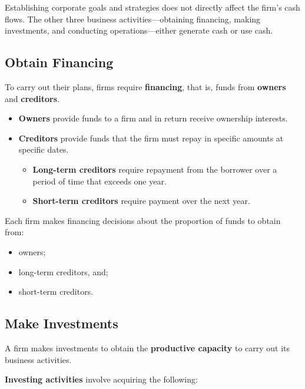 \documentclass{article}\usepackage[]{graphicx}\usepackage[]{xcolor}
\begin{document}
Establishing corporate goals and strategies does not directly affect the firm's cash flows.
The other three business activities---obtaining financing, making investments, and 
conducting operations---either generate cash or use cash.\par

\subsection{Obtain Financing}

To carry out their plans, firms require \textbf{financing}, that is, funds from 
\textbf{owners} and \textbf{creditors}.\par

\begin{itemize}
  \item \textbf{Owners} provide funds to a firm and in return receive ownership interests.
  \item \textbf{Creditors} provide funds that the firm must repay in specific amounts at specific dates.
  
    \begin{itemize}
      \item \textbf{Long-term creditors} require repayment from the borrower over a period of time that exceeds one year.
      \item \textbf{Short-term creditors} require payment over the next year.
    \end{itemize}

\end{itemize}

Each firm makes financing decisions about the proportion of funds to obtain from: 

\begin{itemize}
  \item owners;
  \item long-term creditors, and;
  \item short-term creditors.
\end{itemize}

\subsection{Make Investments}

A firm makes investments to obtain the \textbf{productive capacity} to carry out its business activities.\par

\textbf{Investing activities} involve acquiring the following:
\end{document}
